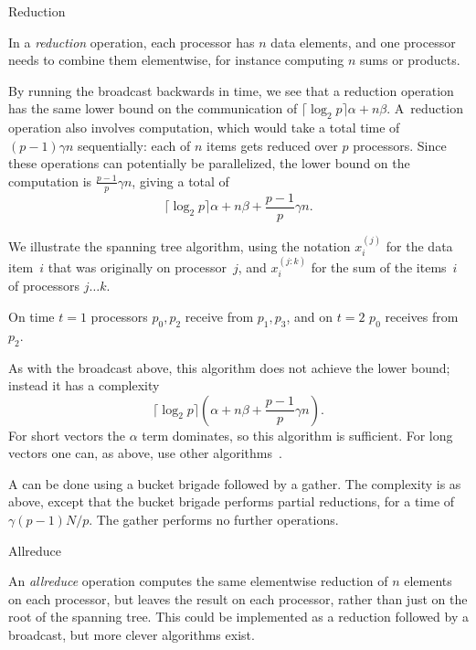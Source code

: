 
 {Reduction}
\label{sec:reduction}

In a \emph{reduction} operation, each processor has $n$ data elements, and
one processor needs to combine them elementwise, for instance
computing $n$ sums or products.

By running the broadcast backwards in time, we see that a reduction
operation has the same lower bound on the communication of
$\lceil\log_2 p\rceil \alpha+n\beta$.  A~reduction operation also
involves computation, which would take a total time of $(p-1)\gamma n$
sequentially: each of
$n$ items gets reduced over $p$ processors. Since these operations can
potentially be parallelized, the lower bound on the computation is
$\frac{p-1}p \gamma n$, giving a total of
    \[ \lceil\log_2 p\rceil \alpha+n\beta +\frac{p-1}p \gamma n. \]

We illustrate the spanning tree algorithm,
using the notation $x_i^{(j)}$ for the data item~$i$
that was originally on processor~$j$, and $x_i^{(j:k)}$ for the sum of
the items~$i$ of processors $j\ldots k$.



On time $t=1$ processors $p_0,p_2$ receive from $p_1,p_3$, and on
$t=2$ $p_0$ receives from~$p_2$.

As with the broadcast above, 
this algorithm does not achieve the lower bound; instead it has a complexity
\[ \lceil\log_2 p\rceil (\alpha+n\beta +\frac{p-1}p \gamma n). \]
For short vectors the $\alpha$ term dominates, so this algorithm is sufficient.
For long vectors one can, as above, use other algorithms~\cite{Chan2007Collective}.

A  can be done using a bucket
brigade followed by a gather. The complexity is as above, except that
the bucket brigade performs partial reductions, for a time
of~$\gamma(p-1)N/p$. The gather performs no further operations.


 {Allreduce}
\label{sec:allreduce}

An \emph{allreduce} operation computes the same elementwise reduction of $n$
elements on each processor, but leaves the result on each processor,
rather than just on the root of the spanning tree. This could be
implemented as a reduction followed by a broadcast, but more clever
algorithms exist.



